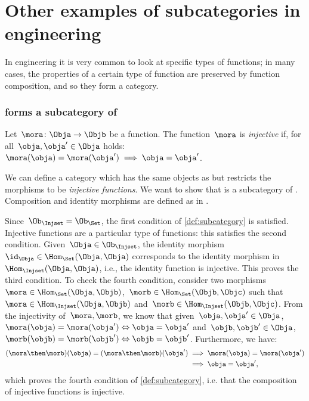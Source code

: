 

\section{Other examples of subcategories in engineering}

In engineering it is very common to look at specific types of functions; in many cases, the properties of a certain type of function are preserved by function composition, and so they form a category.

\subsubsection{\Injset forms a subcategory of \Set}
\begin{definition}
    \label{def:injective-function}
    Let~$\mora \colon \Obja\to \Objb$ be a function. The function~$\mora$ is \emph{injective} if, for all~$\obja,\obja'\in \Obja$ holds:~$\mora(\obja)=\mora(\obja')\implies \obja=\obja'$.
\end{definition}


\begin{example}
    We can define a category \iindex{\Injset} which has the same objects as \Set but restricts the morphisms to be \emph{injective functions}.
    We want to show that \Injset is a subcategory of \Set. Composition and identity morphisms are defined as in \Set.

    Since~$\Ob_{\Injset}=\Ob_{\Set}$, the first condition of \cref{def:subcategory} is satisfied. Injective functions are a particular type of functions: this satisfies the second condition. Given~$\Obja\in \Ob_{\Injset}$, the identity morphism~$\id_\Obja\in \Hom_{\Set}(\Obja,\Obja)$ corresponds to the identity morphism in~$\Hom_{\Injset}(\Obja,\Obja)$, i.e., the identity function is injective. This proves the third condition. To check the fourth condition, consider two morphisms~$\mora \in \Hom_\Set(\Obja,\Objb)$,~$\morb \in \Hom_\Set(\Objb,\Objc)$ such that~$\mora \in \Hom_\Injset(\Obja,\Objb)$ and~$\morb\in \Hom_\Injset(\Objb,\Objc)$. From the injectivity of~$\mora,\morb$, we know that given~$\obja,\obja'\in \Obja$, $\mora(\obja)=\mora(\obja') \Leftrightarrow \obja=\obja'$ and~$\objb,\objb'\in \Obja$,~$\morb(\objb)=\morb(\objb') \Leftrightarrow \objb=\objb'$. Furthermore, we have:
    \begin{equation*}
        \begin{aligned}
        (\mora\then \morb)(\obja)
            =(\mora \then \morb)(\obja')&\implies \mora(\obja)=\mora(\obja')\\
            &\implies \obja=\obja',
        \end{aligned}
    \end{equation*}
    which proves the fourth condition of \cref{def:subcategory}, i.e. that the composition of injective functions is injective.
\end{example}



